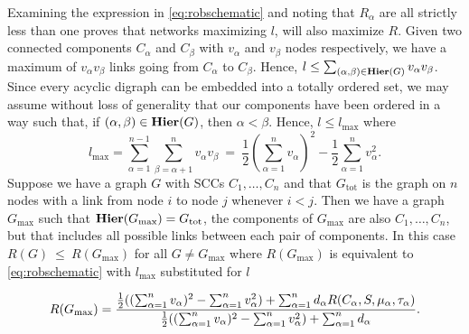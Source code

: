 Examining the expression in \ref{eq:robschematic} and noting that $R_{\alpha}$ are all strictly less than one proves that networks maximizing $l$, will also maximize $R$.  Given two connected components $C_{\alpha}$ and $C_{\beta}$ with $v_{\alpha}$ and $v_{\beta}$ nodes respectively, we have a maximum of $v_{\alpha} v_{\beta}$ links going from $C_{\alpha}$ to $C_{\beta}$.  Hence, $l \le \sum_{(\alpha,\beta) \in \mathbf{Hier}(G)} v_{\alpha} v_{\beta}$.  Since every acyclic digraph can be embedded into a totally ordered
set, we may assume without loss of generality that our components have
been ordered in a way such that, if $(\alpha,\beta) \in \mathbf{Hier}(G)$, then $\alpha <
\beta$.  Hence, $l \le l_{\mathrm{max}}$ where
$$l_{\mathrm{max}} = \sum_{\alpha=1}^{n-1}\sum_{\beta=\alpha+1}^{n}v_{\alpha}
v_{\beta}~=~\frac{1}{2} \left( \sum_{\alpha=1}^{n} v_{\alpha} \right)^2-\frac{1}{2} \sum_{\alpha=1}^{n}
v_{\alpha}^2.$$
Suppose we have a graph $G$ with SCCs $C_1,\ldots,C_n$ and that $G_{\mathrm{tot}}$
is the graph on $n$ nodes with a link from node $i$ to node $j$ whenever $i < j$.  Then we have a graph $G_{\mathrm{max}}$ such that $\mathbf{Hier} (G_{\mathrm{max}}) = G_{\mathrm{tot}}$, the components of $G_{\mathrm{max}}$ are also $C_1, \ldots, C_n$, but that includes all possible links between each pair of components. In this case $R(G)~\le~R(G_{\mathrm{max}})$ for all $G \ne G_{\mathrm{max}}$ where $R(G_{\mathrm{max}})$ is equivalent to \ref{eq:robschematic} with $l_{\mathrm{max}}$ substituted for $l$
\begin{widetext}
\begin{align} \label{eq:sccmaxrobustness}
R(G_{\mathrm{max}}) =
\frac{\frac{1}{2} ((\sum_{\alpha=1}^n v_{\alpha})^2 - \sum_{\alpha=1}^n v_{\alpha}^2) +
                    \sum_{\alpha=1}^n d_{\alpha}
                R(C_{\alpha},S,\mu_{\alpha},\tau_{\alpha})}
     {\frac{1}{2} ((\sum_{\alpha=1}^n v_{\alpha})^2 - \sum_{\alpha=1}^n v_{\alpha}^2) +
                    \sum_{\alpha=1}^n d_{\alpha}}.
\end{align}
\end{widetext}
